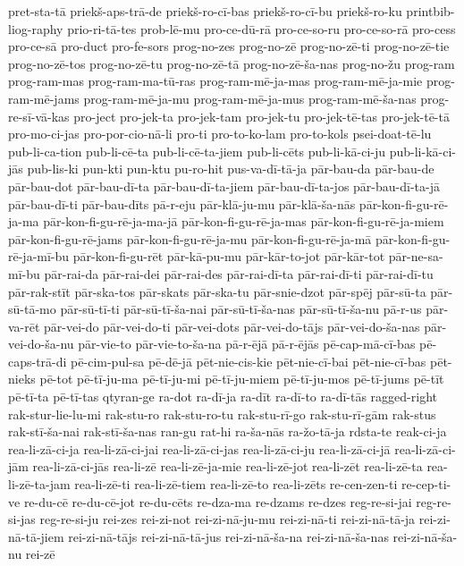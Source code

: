 {pret-sta-tā
priekš-aps-trā-de
priekš-ro-cī-bas
priekš-ro-cī-bu
priekš-ro-ku
printbib-liog-raphy
prio-ri-tā-tes
prob-lē-mu
pro-ce-dū-rā
pro-ce-so-ru
pro-ce-so-rā
pro-cess
pro-ce-sā
pro-duct
pro-fe-sors
prog-no-zes
prog-no-zē
prog-no-zē-ti
prog-no-zē-tie
prog-no-zē-tos
prog-no-zē-tu
prog-no-zē-tā
prog-no-zē-ša-nas
prog-no-žu
prog-ram
prog-ram-mas
prog-ram-ma-tū-ras
prog-ram-mē-ja-mas
prog-ram-mē-ja-mie
prog-ram-mē-jams
prog-ram-mē-ja-mu
prog-ram-mē-ja-mus
prog-ram-mē-ša-nas
prog-re-sī-vā-kas
pro-ject
pro-jek-ta
pro-jek-tam
pro-jek-tu
pro-jek-tē-tas
pro-jek-tē-tā
pro-mo-ci-jas
pro-por-cio-nā-li
pro-ti
pro-to-ko-lam
pro-to-kols
psei-doat-tē-lu
pub-li-ca-tion
pub-li-cē-ta
pub-li-cē-ta-jiem
pub-li-cēts
pub-li-kā-ci-ju
pub-li-kā-ci-jās
pub-lis-ki
pun-kti
pun-ktu
pu-ro-hit
pus-va-dī-tā-ja
pār-bau-da
pār-bau-de
pār-bau-dot
pār-bau-dī-ta
pār-bau-dī-ta-jiem
pār-bau-dī-ta-jos
pār-bau-dī-ta-jā
pār-bau-dī-ti
pār-bau-dīts
pā-r-eju
pār-klā-ju-mu
pār-klā-ša-nās
pār-kon-fi-gu-rē-ja-ma
pār-kon-fi-gu-rē-ja-ma-jā
pār-kon-fi-gu-rē-ja-mas
pār-kon-fi-gu-rē-ja-miem
pār-kon-fi-gu-rē-jams
pār-kon-fi-gu-rē-ja-mu
pār-kon-fi-gu-rē-ja-mā
pār-kon-fi-gu-rē-ja-mī-bu
pār-kon-fi-gu-rēt
pār-kā-pu-mu
pār-kār-to-jot
pār-kār-tot
pār-ne-sa-mī-bu
pār-rai-da
pār-rai-dei
pār-rai-des
pār-rai-dī-ta
pār-rai-dī-ti
pār-rai-dī-tu
pār-rak-stīt
pār-ska-tos
pār-skats
pār-ska-tu
pār-snie-dzot
pār-spēj
pār-sū-ta
pār-sū-tā-mo
pār-sū-tī-ti
pār-sū-tī-ša-nai
pār-sū-tī-ša-nas
pār-sū-tī-ša-nu
pā-r-us
pār-va-rēt
pār-vei-do
pār-vei-do-ti
pār-vei-dots
pār-vei-do-tājs
pār-vei-do-ša-nas
pār-vei-do-ša-nu
pār-vie-to
pār-vie-to-ša-na
pā-r-ējā
pā-r-ējās
pē-cap-mā-cī-bas
pē-caps-trā-di
pē-cim-pul-sa
pē-dē-jā
pēt-nie-cis-kie
pēt-nie-cī-bai
pēt-nie-cī-bas
pēt-nieks
pē-tot
pē-tī-ju-ma
pē-tī-ju-mi
pē-tī-ju-miem
pē-tī-ju-mos
pē-tī-jums
pē-tīt
pē-tī-ta
pē-tī-tas
qtyran-ge
ra-dot
ra-dī-ja
ra-dīt
ra-dī-to
ra-dī-tās
ragged-right
rak-stur-lie-lu-mi
rak-stu-ro
rak-stu-ro-tu
rak-stu-rī-go
rak-stu-rī-gām
rak-stus
rak-stī-ša-nai
rak-stī-ša-nas
ran-gu
rat-hi
ra-ša-nās
ra-žo-tā-ja
rdsta-te
reak-ci-ja
rea-li-zā-ci-ja
rea-li-zā-ci-jai
rea-li-zā-ci-jas
rea-li-zā-ci-ju
rea-li-zā-ci-jā
rea-li-zā-ci-jām
rea-li-zā-ci-jās
rea-li-zē
rea-li-zē-ja-mie
rea-li-zē-jot
rea-li-zēt
rea-li-zē-ta
rea-li-zē-ta-jam
rea-li-zē-ti
rea-li-zē-tiem
rea-li-zē-to
rea-li-zēts
re-cen-zen-ti
re-cep-ti-ve
re-du-cē
re-du-cē-jot
re-du-cēts
re-dza-ma
re-dzams
re-dzes
reg-re-si-jai
reg-re-si-jas
reg-re-si-ju
rei-zes
rei-zi-not
rei-zi-nā-ju-mu
rei-zi-nā-ti
rei-zi-nā-tā-ja
rei-zi-nā-tā-jiem
rei-zi-nā-tājs
rei-zi-nā-tā-jus
rei-zi-nā-ša-na
rei-zi-nā-ša-nas
rei-zi-nā-ša-nu
rei-zē
}
